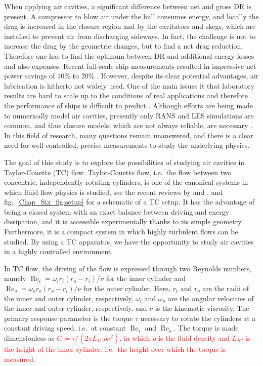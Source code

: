 \documentclass[aps,onecolumn,10pt, floatfix, superscriptaddress,longbibliography, pra]{revtex4-1}
\newcommand{\red}[1]{\textcolor{red}{#1}}
\renewcommand{\Re}{\operatorname{Re}}
\begin{document}
When applying air cavities, a significant difference between net and gross DR is present. A compressor to blow air under the hull consumes energy, and locally the drag is increased in the closure region and  by the cavitators and skegs, which are installed to prevent air from discharging sideways. In fact, the challenge is not to increase the drag by the geometric changes, but to find a net drag reduction. Therefore one has to find the optimum between DR and additional energy losses and also expenses. Recent full-scale ship measurements resulted in impressive net power savings of $10\%$ to $20\%$ \citep{Latorre1997,  Hoang2009,Mizokami2010,Amromin2011, Makiharju2012,kumagai2015}. However, despite its clear potential advantages, air lubrication is hitherto not widely used. One of the main issues it that laboratory results are hard to scale up to the conditions of real applications and therefore the performance of ships is difficult to predict \citep{murai2014}. Although efforts are being made to numerically model air cavities, presently only RANS and LES simulations are common, and thus closure models, which are not always reliable, are necessary \citep{Rotte2016}. In this field of research, many questions remain unanswered, and there is a clear need for well-controlled, precise measurements to study the underlying physics.


The goal of this study is to explore the possibilities of studying air cavities in Taylor-Couette (TC) flow. Taylor-Couette flow, i.e.\ the flow between two concentric, independently rotating cylinders, is one of the canonical systems in which fluid flow physics is studied, see the recent reviews by \citet{far14} and \citet{gro16}, and fig.\ \ref{Chap_Six_fig:setup} for a schematic of a TC setup. It has the advantage of being a closed system with an exact balance between driving and energy dissipation, and it is accessible experimentally thanks to its simple geometry. Furthermore, it is a compact system in which highly turbulent flows can be studied. By using a TC apparatus, we have the opportunity to study air cavities in a highly controlled environment. 

In TC flow, the driving of the flow is expressed through two Reynolds numbers, namely $\Re_i=\omega_i r_i (r_o-r_i)/\nu$  for the inner cylinder and $\Re_o=\omega_o r_o (r_o-r_i)/\nu$ for the outer cylinder. Here, $r_i$ and $r_o$ are the radii of the inner and outer cylinder, respectively, $\omega_{i}$ and $\omega_o$ are the angular velocities of the inner and outer cylinder, respectively, and $\nu$ is the kinematic viscosity. The primary response parameter is the torque $\tau$ necessary to rotate the cylinders at a constant driving speed, i.e.\ at constant $\Re_i$ and $\Re_o$. The torque is made dimensionless as \red{$G = {\tau} / (2 \pi L_{IC} \rho \nu^2)$, in which $\rho$ is the fluid density and $L_{IC}$ is the height of the inner cylinder, i.e.\ the height over which the torque is measured}.
\end{document}
